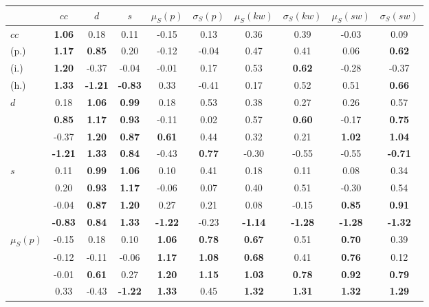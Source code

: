 \begin{table*}[h!]
\begin{center}
\begin{tabular}{| l || c | c | c | c | c | c | c | c | c |}\hline
 & $cc$ & $d$ & $s$ & $\mu_S(p)$ & $\sigma_S(p)$ & $\mu_S(kw)$ & $\sigma_S(kw)$ & $\mu_S(sw)$ & $\sigma_S(sw)$ \\\hline\hline
$cc$ & {\bf 1.06} & 0.18 & 0.11 & -0.15 & 0.13 & 0.36 & 0.39 & -0.03 & 0.09 \\
(p.) & {\bf 1.17} & {\bf 0.85} & 0.20 & -0.12 & -0.04 & 0.47 & 0.41 & 0.06 & {\bf 0.62} \\
(i.) & {\bf 1.20} & -0.37 & -0.04 & -0.01 & 0.17 & 0.53 & {\bf 0.62} & -0.28 & -0.37 \\
(h.) & {\bf 1.33} & {\bf -1.21} & {\bf -0.83} & 0.33 & -0.41 & 0.17 & 0.52 & 0.51 & {\bf 0.66} \\\hline
$d$ & 0.18 & {\bf 1.06} & {\bf 0.99} & 0.18 & 0.53 & 0.38 & 0.27 & 0.26 & 0.57 \\
 & {\bf 0.85} & {\bf 1.17} & {\bf 0.93} & -0.11 & 0.02 & 0.57 & {\bf 0.60} & -0.17 & {\bf 0.75} \\
 & -0.37 & {\bf 1.20} & {\bf 0.87} & {\bf 0.61} & 0.44 & 0.32 & 0.21 & {\bf 1.02} & {\bf 1.04} \\
 & {\bf -1.21} & {\bf 1.33} & {\bf 0.84} & -0.43 & {\bf 0.77} & -0.30 & -0.55 & -0.55 & {\bf -0.71} \\\hline
$s$ & 0.11 & {\bf 0.99} & {\bf 1.06} & 0.10 & 0.41 & 0.18 & 0.11 & 0.08 & 0.34 \\\hline
 & 0.20 & {\bf 0.93} & {\bf 1.17} & -0.06 & 0.07 & 0.40 & 0.51 & -0.30 & 0.54 \\\hline
 & -0.04 & {\bf 0.87} & {\bf 1.20} & 0.27 & 0.21 & 0.08 & -0.15 & {\bf 0.85} & {\bf 0.91} \\\hline
 & {\bf -0.83} & {\bf 0.84} & {\bf 1.33} & {\bf -1.22} & -0.23 & {\bf -1.14} & {\bf -1.28} & {\bf -1.28} & {\bf -1.32} \\\hline
$\mu_S(p)$ & -0.15 & 0.18 & 0.10 & {\bf 1.06} & {\bf 0.78} & {\bf 0.67} & 0.51 & {\bf 0.70} & 0.39 \\\hline
 & -0.12 & -0.11 & -0.06 & {\bf 1.17} & {\bf 1.08} & {\bf 0.68} & 0.41 & {\bf 0.76} & 0.12 \\\hline
 & -0.01 & {\bf 0.61} & 0.27 & {\bf 1.20} & {\bf 1.15} & {\bf 1.03} & {\bf 0.78} & {\bf 0.92} & {\bf 0.79} \\\hline
 & 0.33 & -0.43 & {\bf -1.22} & {\bf 1.33} & 0.45 & {\bf 1.32} & {\bf 1.31} & {\bf 1.32} & {\bf 1.29} \\\hline

\end{tabular}
\end{center}
\end{table*}
